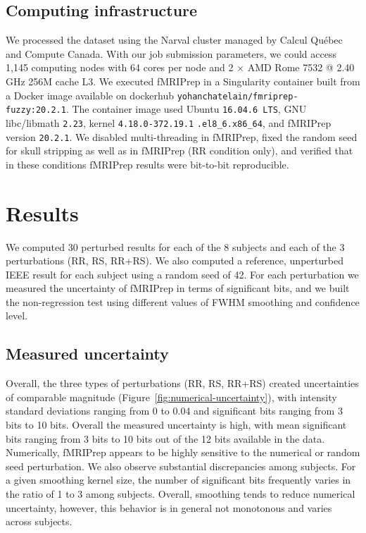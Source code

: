 \documentclass{article}
\newcommand{\TG}[1]{\color{blue}\textsc{From Tristan:} #1\color{black}\xspace}
\newcommand{\fmriprep}{fMRIPrep \xspace}
\begin{document}


\subsection{Computing infrastructure}

We processed the dataset using the Narval cluster managed by Calcul Qu\'ebec and
Compute Canada. With our job submission parameters, we could access 1,145
computing nodes with 64 cores per node and 2 $\times$ AMD Rome 7532 @ 2.40 GHz
256M cache L3. We executed \fmriprep in a Singularity container built from a
Docker image available on dockerhub \texttt{yohanchatelain/fmriprep-fuzzy:20.2.1}.
The container image used Ubuntu \texttt{16.04.6 LTS}, GNU
libc/libmath \texttt{2.23}, kernel \texttt{4.18.0-372.19.1}
\texttt{.el8\_6.x86\_64}, and fMRIPrep version \texttt{20.2.1}. We disabled
multi-threading in fMRIPrep, fixed the random seed for skull stripping as well
as in fMRIPrep (RR condition only), and verified that in these conditions
fMRIPrep results were bit-to-bit reproducible.

\section{Results}

We computed 30 perturbed results for each of the 8 subjects and each of the 3
perturbations (RR, RS, RR+RS). We also computed a reference, unperturbed IEEE
result for each subject using a random seed of 42. For each perturbation we
measured the uncertainty of fMRIPrep in terms of significant bits, and we
built the non-regression test using different values of FWHM smoothing and confidence level.

\subsection{Measured uncertainty}

Overall, the three types of perturbations (RR, RS, RR+RS) created uncertainties
of comparable magnitude (Figure~\ref{fig:numerical-uncertainty}), with intensity
standard deviations ranging from 0 to 0.04 and significant bits ranging from 3
bits to 10 bits. Overall the measured uncertainty is high, with mean significant bits
ranging from 3 bits to 10 bits out of the 12 bits available in the data. Numerically, \fmriprep
appears to be highly sensitive to the numerical or random seed perturbation. We also observe
substantial discrepancies among subjects. For a given smoothing kernel size,
the number of significant bits frequently varies in the ratio of 1 to 3 among subjects.
Overall, smoothing tends to reduce numerical uncertainty, however, this behavior is in general not monotonous
and varies across subjects.
\end{document}
